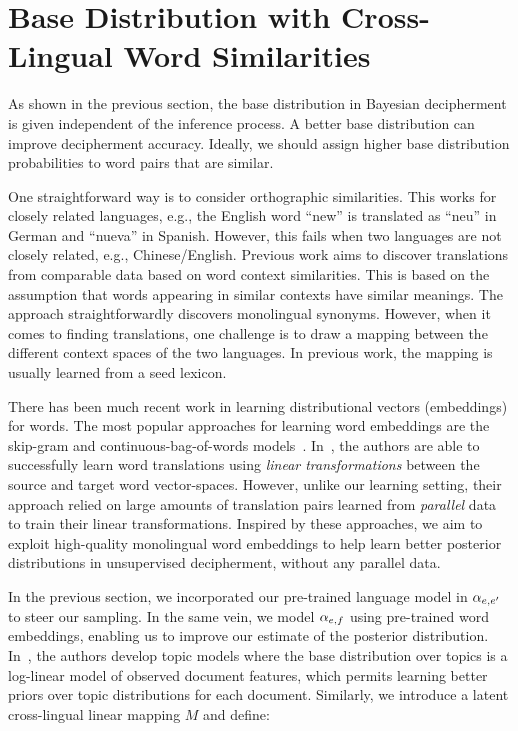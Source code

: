 \section{Base Distribution with Cross-Lingual Word Similarities} \label{sec:theory}

As shown in the previous section, the base distribution in Bayesian decipherment is given independent of the inference process. 
A better base distribution can improve decipherment accuracy. Ideally, we should assign higher base distribution probabilities to word pairs that are similar.

One straightforward way is to consider orthographic similarities. This works for closely related languages, e.g., the English word ``new'' is translated as ``neu'' in German and ``nueva'' in Spanish. However, this fails when two languages are not closely related, e.g., Chinese/English. Previous work aims to discover translations from comparable data based on word context similarities. This is based on the assumption that words appearing in similar contexts have similar meanings. The approach straightforwardly discovers monolingual synonyms. However, when it comes to finding translations, one challenge is to draw a mapping between the different context spaces of the two languages. In previous work, the mapping is usually learned from a seed lexicon.

There has been much recent work in learning distributional vectors (embeddings) for words. The most popular approaches for learning word embeddings are the skip-gram and continuous-bag-of-words models~\cite{mikolov2013efficient}. In~, the authors are  able to successfully learn word translations using {\em linear transformations} between the source and target word vector-spaces. However, unlike our learning setting, their approach relied on large amounts of translation pairs learned from \emph{parallel} data to train their linear transformations. Inspired by these approaches, we aim to exploit high-quality monolingual word embeddings to help learn better posterior distributions in unsupervised decipherment, without any parallel data.

In the previous section, we incorporated our pre-trained language model in $\alpha_{e,e'}$ to steer our sampling. In the same vein, we model $\alpha_{e,f}$ using pre-trained word embeddings, enabling us to improve our estimate of the posterior distribution. In~, the authors develop topic models where the base distribution over topics is a log-linear model of observed document features, which permits learning better priors over topic distributions for each document. Similarly, we introduce a latent cross-lingual linear mapping $M$ and define:

